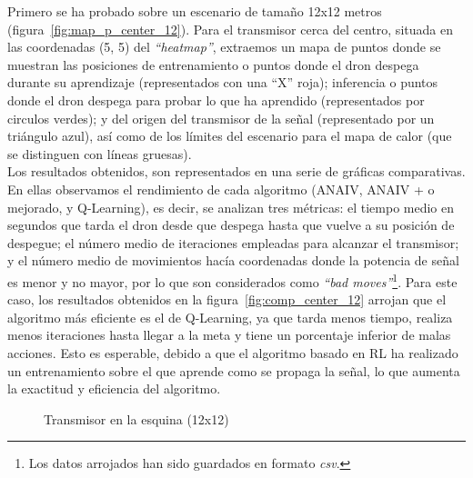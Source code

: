 Primero se ha probado sobre un escenario de tamaño 12x12 metros (figura~\ref{fig:map_p_center_12}). Para el transmisor cerca del centro, situada en las coordenadas (5, 5) del \emph{``heatmap''}, extraemos un mapa de puntos donde se muestran las posiciones de entrenamiento o puntos donde el dron despega durante su aprendizaje (representados con una ``X'' roja); inferencia o puntos donde el dron despega para probar lo que ha aprendido (representados por circulos verdes); y del origen del transmisor de la señal (representado por un triángulo azul), así como de los límites del escenario para el mapa de calor (que se distinguen con líneas gruesas).\\

Los resultados obtenidos, son representados en una serie de gráficas comparativas. En ellas observamos el rendimiento de cada algoritmo (\ac{ANAIV}, \ac{ANAIV} + o mejorado, y Q-Learning), es decir, se analizan tres métricas: el tiempo medio en segundos que tarda el dron desde que despega hasta que vuelve a su posición de despegue; el número medio de iteraciones empleadas para alcanzar el transmisor; y el número medio de movimientos hacía coordenadas donde la potencia de señal es menor y no mayor, por lo que son considerados como \emph{``bad moves''}\footnote[5]{Los datos arrojados han sido guardados en formato \emph{csv}.}. Para este caso, los resultados obtenidos en la figura~\ref{fig:comp_center_12} arrojan que el algoritmo más eficiente es el de Q-Learning, ya que tarda menos tiempo, realiza menos iteraciones hasta llegar a la meta y tiene un porcentaje inferior de malas acciones. Esto es esperable, debido a que el algoritmo basado en \ac{RL} ha realizado un entrenamiento sobre el que aprende como se propaga la señal, lo que aumenta la exactitud y eficiencia del algoritmo.\\

\begin{figure} [tp]
	\centering
	\quad
	\caption{Transmisor en la esquina (12x12)}
	\label{fig:map_p_esq_12}
\end{figure}

